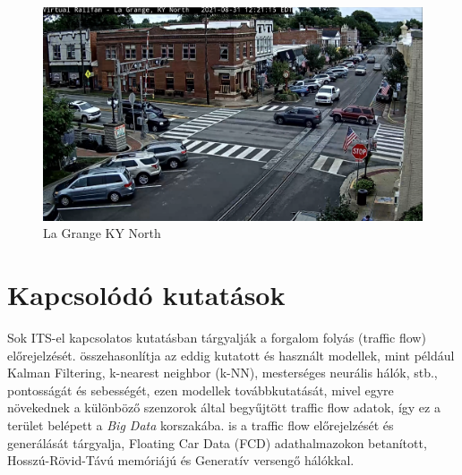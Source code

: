 \documentclass[acmtog, authorversion]{acmart}
\begin{document}
\begin{figure}
    \includegraphics[width=1\columnwidth]{dataset_samples/lagrange_kynorth.png}
    \caption{La Grange KY North}
    \label{lagrangekynorth}
\end{figure}

\section{Kapcsolódó kutatások}
Sok ITS-el kapcsolatos kutatásban tárgyalják a forgalom folyás (traffic flow) előrejelzését. \cite{PAUL2017177} összehasonlítja az eddig
kutatott és használt modellek, mint például Kalman Filtering, k-nearest neighbor (k-NN), mesterséges neurális hálók, stb., pontosságát és
sebességét, ezen modellek továbbkutatását, mivel egyre növekednek a különböző szenzorok által  begyűjtött traffic flow adatok, így ez a terület belépett
a \emph{Big Data} korszakába. \cite{10.1371/journal.pone.0253868} is a traffic flow előrejelzését és generálását tárgyalja, Floating Car Data (FCD) 
adathalmazokon betanított, Hosszú-Rövid-Távú memóriájú és Generatív versengő hálókkal.
\end{document}
